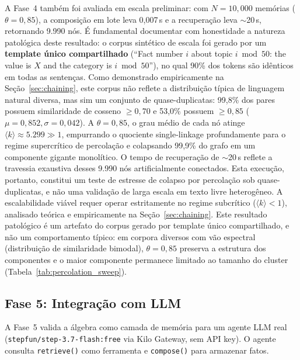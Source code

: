 \documentclass[11pt,a4paper]{article}
\theoremstyle{definition}
\begin{document}
A Fase~4 tamb\'em foi avaliada em escala preliminar: com $N = 10{,}000$ mem\'orias ($\theta = 0{,}85$), a composi\c{c}\~ao em lote leva 0,007\,s e a recupera\c{c}\~ao leva $\sim$20\,s, retornando 9.990 n\'os. \'E fundamental documentar com honestidade a natureza patol\'ogica deste resultado: o corpus sint\'etico de escala foi gerado por um \textbf{template \'unico compartilhado} (``Fact number $i$ about topic $i \bmod 50$: the value is $X$ and the category is $i \bmod 50$''), no qual 90\% dos tokens s\~ao id\^enticos em todas as senten\c{c}as. Como demonstrado empiricamente na Se\c{c}\~ao~\ref{sec:chaining}, este corpus n\~ao reflete a distribui\c{c}\~ao t\'ipica de linguagem natural diversa, mas sim um conjunto de quase-duplicatas: 99,8\% dos pares possuem similaridade de cosseno $\ge 0{,}70$ e 53,0\% possuem $\ge 0{,}85$ ($\mu = 0{,}852, \sigma = 0{,}042$). A $\theta = 0{,}85$, o grau m\'edio de cada n\'o atinge $\langle k \rangle \approx 5.299 \gg 1$, empurrando o quociente single-linkage profundamente para o regime supercr\'itico de percola\c{c}\~ao e colapsando 99,9\% do grafo em um componente gigante monol\'itico. O tempo de recupera\c{c}\~ao de $\sim$20\,s reflete a travessia exaustiva desses 9.990 n\'os artificialmente conectados. Esta execu\c{c}\~ao, portanto, constitui um teste de estresse de colapso por percola\c{c}\~ao sob quase-duplicatas, e n\~ao uma valida\c{c}\~ao de larga escala em texto livre heterog\^eneo. A escalabilidade vi\'avel requer operar estritamente no regime subcr\'itico ($\langle k \rangle < 1$), analisado te\'orica e empiricamente na Se\c{c}\~ao~\ref{sec:chaining}. Este resultado patol\'ogico \'e um artefato do corpus gerado por template \'unico compartilhado, e n\~ao um comportamento t\'ipico: em corpora diversos com v\~ao espectral (distribui\c{c}\~ao de similaridade bimodal), $\theta = 0{,}85$ preserva a estrutura dos componentes e o maior componente permanece limitado ao tamanho do cluster (Tabela~\ref{tab:percolation_sweep}).

\subsection{Fase 5: Integra\c{c}\~ao com LLM}

A Fase~5 valida a \'algebra como camada de mem\'oria para um agente LLM real (\texttt{stepfun/step-3.7-flash:free} via Kilo Gateway, sem API key). O agente consulta \texttt{retrieve()} como ferramenta e \texttt{compose()} para armazenar fatos.
\end{document}
